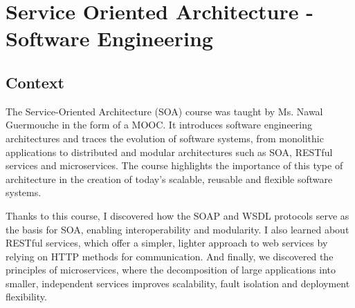 \section{Service Oriented Architecture - Software Engineering}
\label{sec:service_architecture}
\subsection{Context}

\indent \indent The Service-Oriented Architecture (SOA) course was taught by Ms. Nawal Guermouche in the form of a MOOC.
It introduces software engineering architectures and traces the evolution of software systems, from monolithic applications to distributed and modular architectures such as SOA, RESTful services and microservices.
The course highlights the importance of this type of architecture in the creation of today's scalable, reusable and flexible software systems.
\vspace{0.25cm}

Thanks to this course, I discovered how the SOAP and WSDL protocols serve as the basis for SOA, enabling interoperability and modularity.
I also learned about RESTful services, which offer a simpler, lighter approach to web services by relying on HTTP methods for communication. 
And finally, we discovered the principles of microservices, where the decomposition of large applications into smaller, independent services improves scalability, fault isolation and deployment flexibility.
\vspace{0.25cm}

